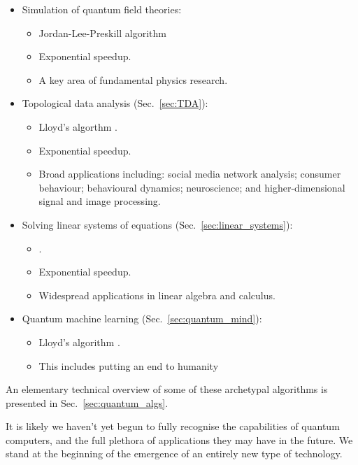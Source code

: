 \begin{itemize}
\begin{itemize}
			\end{itemize}
	\item Simulation of quantum field theories:
		\begin{itemize}
		 \item Jordan-Lee-Preskill algorithm \cite{bib:JLP, bib:RohdeWavelet15}
		 \item Exponential speedup.
		 \item A key area of fundamental physics research.
		 \end{itemize}
	\item Topological data analysis (Sec.~\ref{sec:TDA}):
		\begin{itemize}
		\item Lloyd's algorthm \cite{bib:lloyd2016quantum, USTCexperiment}.
		\item Exponential speedup.
		\item Broad applications including: social media network analysis; consumer behaviour; behavioural dynamics; neuroscience; and higher-dimensional signal and image processing.
		\end{itemize}
	\item Solving linear systems of equations (Sec.~\ref{sec:linear_systems}):
		\begin{itemize}
		\item {} \cite{bib:harrow2009quantum, bib:BerryLinear}.
		\item Exponential speedup.
		\item Widespread applications in linear algebra and calculus.
		\end{itemize}
	\item Quantum machine learning (Sec.~\ref{sec:quantum_mind}):
		\begin{itemize}
		\item Lloyd's algorithm \cite{bib:lloyd2013quantum}.
		\item This includes putting an end to humanity 
		\end{itemize}
\end{itemize}
An elementary technical overview of some of these archetypal algorithms is presented in Sec.~\ref{sec:quantum_algs}.

It is likely we haven't yet begun to fully recognise the capabilities of quantum computers, and the full plethora of applications they may have in the future. We stand at the beginning of the emergence of an entirely new type of technology.

